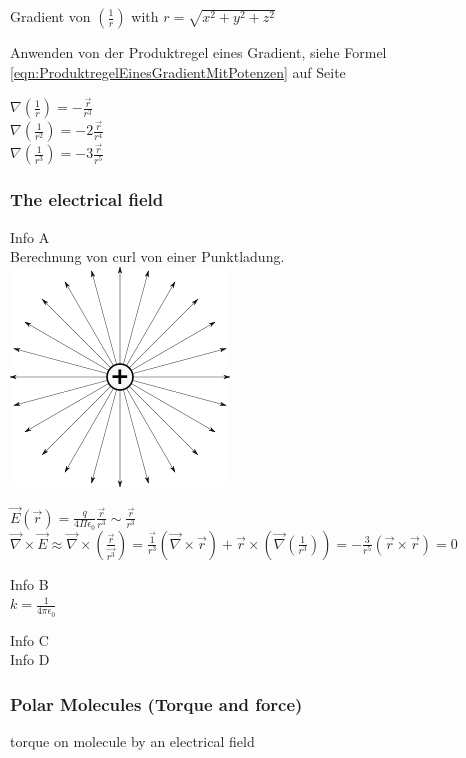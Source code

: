 \documentclass[a4paper]{scrartcl}
\begin{document}
Gradient von $ (\frac{1}{r}) $  with $ r=\sqrt{x^2+y^2+z^2} $

Anwenden von der Produktregel eines Gradient, siehe Formel \ref{eqn:ProduktregelEinesGradientMitPotenzen} auf Seite \pageref{eqn:ProduktregelEinesGradientMitPotenzen}

$ \nabla(\frac{1}{r}) = -\frac{\vec{r}}{r^3}$
\\
$ \nabla(\frac{1}{r^2}) = -2\frac{\vec{r}}{r^4}$
\\
$ \nabla(\frac{1}{r^3}) = -3\frac{\vec{r}}{r^5}$

\subsubsection{The electrical field}

Info A\\
Berechnung von curl von einer Punktladung.\\ \includegraphics[scale=0.2]{images/punktladung.png}
\label{fig:Punktladung}

$ \vec{E}(\vec{r})=\frac{q}{4\Pi\epsilon_0}\frac{\vec{r}}{r^3}\sim \frac{\vec{r}}{r^3} $
\\
$ \vec{\nabla}\times\vec{E}\approx\vec{\nabla}\times(\frac{\vec{r}}{\vec{r^3}})=\frac{\vec{1}}{r^3}(\vec{\nabla}\times\vec{r})+\vec{r}\times(\vec{\nabla}(\frac{1}{r^3}))=-\frac{3}{r^5}(\vec{r}\times\vec{r})=0 $

Info B\\
$ k=\frac{1}{4\pi\epsilon_0} $

Info C\\


Info D\\

\subsubsection{Polar Molecules (Torque and force)}

torque on molecule by an electrical field\\
\end{document}
